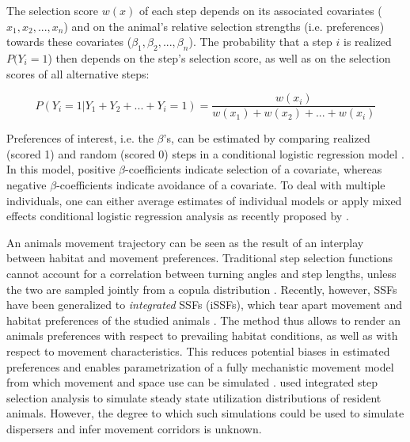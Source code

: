 \documentclass[abstract=on,10pt,a4paper,bibliography=totocnumbered]{article}
\begin{document}
The selection score \(w(x)\) of each step depends on its associated covariates
(\(x_1, x_2, ..., x_n\)) and on the animal's relative selection strengths (i.e.
preferences) towards these covariates (\(\beta_1, \beta_2, ..., \beta_n\)). The
probability that a step \(i\) is realized \(P(Y_{i} = 1\)) then depends on the
step's selection score, as well as on the selection scores of all alternative
steps:

\begin{equation}
\label{EQ2}
  P(Y_{i} = 1 | Y_{1} + Y_{2} + ... + Y_{i} = 1) =
  \frac{w(x_{i})}{w(x_{1}) + w(x_{2}) + ... + w(x_{i})}
\end{equation}

\noindent Preferences of interest, i.e. the \(\beta\)'s, can be estimated by
comparing realized (scored 1) and random (scored 0) steps in a conditional
logistic regression model \citep{Fortin.2005}. In this model, positive
\(\beta\)-coefficients indicate selection of a covariate, whereas negative
\(\beta\)-coefficients indicate avoidance of a covariate. To deal with multiple
individuals, one can either average estimates of individual models
\citep{Murtaugh.2007, Fieberg.2010} or apply mixed effects conditional logistic
regression analysis as recently proposed by \cite{Muff.2020}.

An animals movement trajectory can be seen as the result of an interplay between
habitat and movement preferences. Traditional step selection functions cannot
account for a correlation between turning angles and step lengths, unless the
two are sampled jointly from a copula distribution \citep{Hodel.2021}. Recently,
however, SSFs have been generalized to \textit{integrated} SSFs (iSSFs), which
tear apart movement and habitat preferences of the studied animals
\citep{Avgar.2016}. The method thus allows to render an animals preferences with
respect to prevailing habitat conditions, as well as with respect to movement
characteristics. This reduces potential biases in estimated preferences and
enables parametrization of a fully mechanistic movement model from which
movement and space use can be simulated \citep{Avgar.2016, Signer.2017}.
\cite{Signer.2017} used integrated step selection analysis to simulate steady
state utilization distributions of resident animals. However, the degree to
which such simulations could be used to simulate dispersers and infer movement
corridors is unknown.
\end{document}
